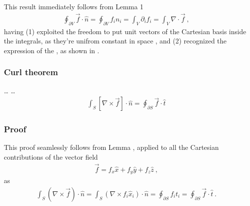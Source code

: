 \documentclass[letterpaper,10pt,english]{jupyterBook}
\begin{document}
\sphinxAtStartPar
This result immediately follows from Lemma 1 {\hyperref[\detokenize{ch/tensor-algebra-calculus/calculus-euclidean:lemma-1}]{}}
\begin{equation*}
\begin{split}\oint_{\partial V} \vec{f} \cdot \hat{n} =  \oint_{\partial V} f_i n_i = \int_{V} \partial_i f_i =  \int_{V} \nabla  \cdot \vec{f} \ , \end{split}
\end{equation*}
\sphinxAtStartPar
having (1) exploited the freedom to put unit vectors of the Cartesian basis inside the integrals, as they’re unifrom \sphinxhyphen{} constant in space \sphinxhyphen{}, and (2) recognized the expression of the {\hyperref[\detokenize{ch/tensor-algebra-calculus/calculus-euclidean-cartesian:tensor-calculus-cartesian-differential-operators-divergence}]{}}, as shown in {\hyperref[\detokenize{ch/tensor-algebra-calculus/calculus-euclidean-cartesian:cartesian:divergence:vector}]{}}.




\subsubsection{Curl theorem}
\label{\detokenize{ch/tensor-algebra-calculus/calculus-euclidean:curl-theorem}}\label{\detokenize{ch/tensor-algebra-calculus/calculus-euclidean:tensor-calculus-integrals-theorems-curl}}
\sphinxAtStartPar
… …
\begin{equation*}
\begin{split}\int_{S} \left[ \nabla \times \vec{f} \right] \cdot \hat{n} = \oint_{\partial S} \vec{f} \cdot \hat{t}\end{split}
\end{equation*}\subsubsection*{Proof}

\sphinxAtStartPar
This proof seamlessly follows from Lemma {\hyperref[\detokenize{ch/tensor-algebra-calculus/calculus-euclidean:lemma-2}]{}}, applied to all the Cartesian contributions of the vector field
\begin{equation*}
\begin{split}\vec{f} = f_x \hat{x} + f_y \hat{y} + f_z \hat{z} \ ,\end{split}
\end{equation*}
\sphinxAtStartPar
as
\begin{equation*}
\begin{split}\int_S \left( \nabla \times \vec{f} \right) \cdot \hat{n} = \int_S \left( \nabla \times f_i \hat{x}_i \right) \cdot \hat{n} = \oint_{\partial S} f_i t_i = \oint_{\partial S} \vec{f} \cdot \hat{t} \ .\end{split}
\end{equation*}
\end{document}
